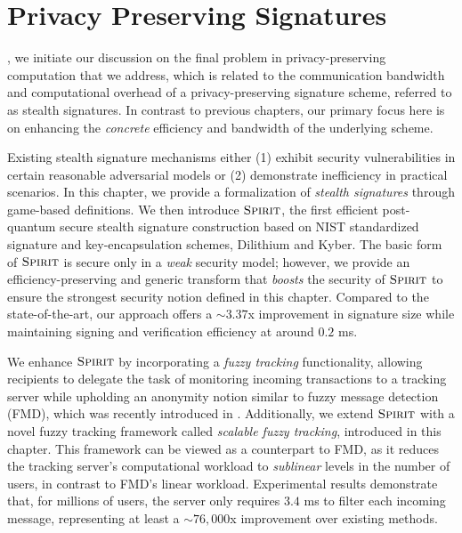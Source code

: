 
\chapter{Privacy Preserving Signatures}
\label{sec:ssig}
, we initiate our discussion on the final problem in privacy-preserving computation that we address, which is related to the communication bandwidth and computational overhead of a privacy-preserving signature scheme, referred to as stealth signatures. In contrast to previous chapters, our primary focus here is on enhancing the \emph{concrete} efficiency and bandwidth of the underlying scheme.

Existing stealth signature mechanisms either (1) exhibit security vulnerabilities in certain reasonable adversarial models or (2) demonstrate inefficiency in practical scenarios. In this chapter, we provide a formalization of \emph{stealth signatures} through game-based definitions.
We then introduce $\textsc{Spirit}$, the first efficient post-quantum secure stealth signature construction based on NIST standardized signature and key-encapsulation schemes, Dilithium and Kyber. The basic form of $\textsc{Spirit}$ is secure only in a \emph{weak} security model; however, we provide an efficiency-preserving and generic transform that \emph{boosts} the security of $\textsc{Spirit}$ to ensure the strongest security notion defined in this chapter. Compared to the state-of-the-art, our approach offers a $\sim 3.37$x improvement in signature size while maintaining signing and verification efficiency at around $0.2$ ms.

We enhance $\textsc{Spirit}$ by incorporating a \emph{fuzzy tracking} functionality, allowing recipients to delegate the task of monitoring incoming transactions to a tracking server while upholding an anonymity notion similar to fuzzy message detection (FMD), which was recently introduced in \cite{CCS:BLMG21}. Additionally, we extend $\textsc{Spirit}$ with a novel fuzzy tracking framework called \emph{scalable fuzzy tracking}, introduced in this chapter. This framework can be viewed as a counterpart to FMD, as it reduces the tracking server's computational workload to \emph{sublinear} levels in the number of users, in contrast to FMD's linear workload. Experimental results demonstrate that, for millions of users, the server only requires $3.4$ ms to filter each incoming message, representing at least a $\sim 76,000$x improvement over existing methods.

